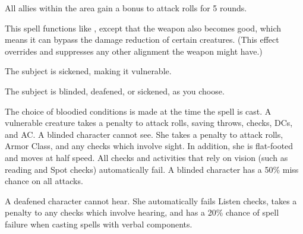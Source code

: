\begin{spelleffect}
  All allies within the area gain a  bonus to attack rolls for 5 rounds. \bonusscalingdescription
\end{spelleffect}

\begin{spelleffect}
  This spell functions like , except that the weapon also becomes good, which means it can bypass the damage reduction of certain creatures. (This effect overrides and suppresses any other alignment the weapon might have.)
\end{spelleffect}

\begin{spellhealthy}
  The subject is sickened, making it vulnerable.
\end{spellhealthy}
\begin{spellblood}
  The subject is blinded, deafened, or sickened, as you choose.
\end{spellblood}
\begin{spellnotes}
   The choice of bloodied conditions is made at the time the spell is cast. A vulnerable creature takes a  penalty to attack rolls, saving throws, checks, DCs, and AC. A blinded character cannot see. She takes a  penalty to attack rolls, Armor Class, and any checks which involve sight. In addition, she is flat-footed and moves at half speed. All checks and activities that rely on vision (such as reading and Spot checks) automatically fail. A blinded character has a 50\% miss chance on all attacks.

  A deafened character cannot hear. She automatically fails Listen checks, takes a  penalty to any checks which involve hearing, and has a 20\% chance of spell failure when casting spells with verbal components.
  

\end{spellnotes}

